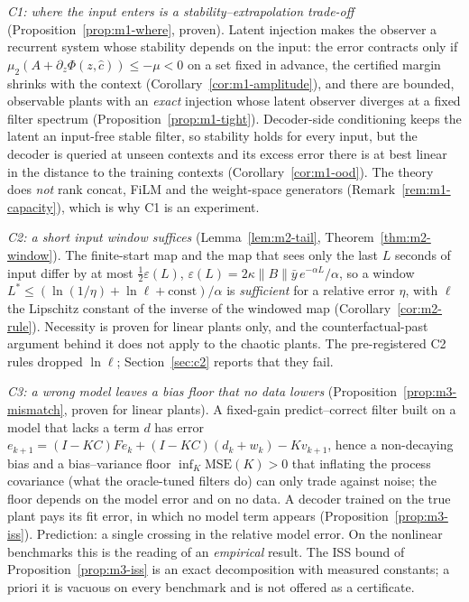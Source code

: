 \emph{C1: where the input enters is a stability--extrapolation trade-off} (Proposition~\ref{prop:m1-where}, proven). Latent injection makes the observer a recurrent system whose stability depends on the input: the error contracts only if $\mu_2(A+\partial_z\Phi(z,\hat c))\le-\mu<0$ on a set fixed in advance, the certified margin shrinks with the context (Corollary~\ref{cor:m1-amplitude}), and there are bounded, observable plants with an \emph{exact} injection whose latent observer diverges at a fixed filter spectrum (Proposition~\ref{prop:m1-tight}). Decoder-side conditioning keeps the latent an input-free stable filter, so stability holds for every input, but the decoder is queried at unseen contexts and its excess error there is at best linear in the distance to the training contexts (Corollary~\ref{cor:m1-ood}). The theory does \emph{not} rank concat, FiLM and the weight-space generators (Remark~\ref{rem:m1-capacity}), which is why C1 is an experiment.

\emph{C2: a short input window suffices} (Lemma~\ref{lem:m2-tail}, Theorem~\ref{thm:m2-window}). The finite-start map and the map that sees only the last $L$ seconds of input differ by at most $\tfrac12\varepsilon(L)$, $\varepsilon(L)=2\kappa\|B\|\bar y\,e^{-\alpha L}/\alpha$, so a window $L^*\le(\ln(1/\eta)+\ln\ell+\mathrm{const})/\alpha$ is \emph{sufficient} for a relative error $\eta$, with $\ell$ the Lipschitz constant of the inverse of the windowed map (Corollary~\ref{cor:m2-rule}). Necessity is proven for linear plants only, and the counterfactual-past argument behind it does not apply to the chaotic plants. The pre-registered C2 rules dropped $\ln\ell$; Section~\ref{sec:c2} reports that they fail.

\emph{C3: a wrong model leaves a bias floor that no data lowers} (Proposition~\ref{prop:m3-mismatch}, proven for linear plants). A fixed-gain predict--correct filter built on a model that lacks a term $d$ has error $e_{k+1}=(I-KC)Fe_k+(I-KC)(d_k+w_k)-Kv_{k+1}$, hence a non-decaying bias and a bias--variance floor $\inf_K\mathrm{MSE}(K)>0$ that inflating the process covariance (what the oracle-tuned filters do) can only trade against noise; the floor depends on the model error and on no data. A decoder trained on the true plant pays its fit error, in which no model term appears (Proposition~\ref{prop:m3-iss}). Prediction: a single crossing in the relative model error. On the nonlinear benchmarks this is the reading of an \emph{empirical} result. The ISS bound of Proposition~\ref{prop:m3-iss} is an exact decomposition with measured constants; a priori it is vacuous on every benchmark and is not offered as a certificate.
